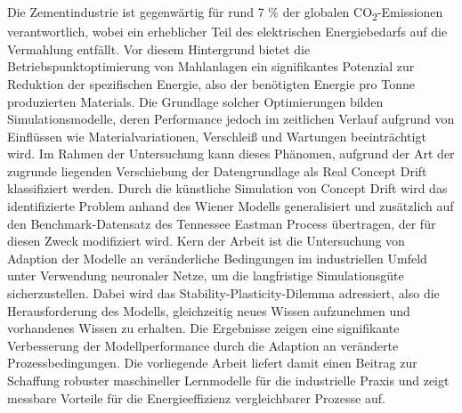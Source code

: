 
Die Zementindustrie ist gegenwärtig für rund 7 \% der globalen CO\textsubscript{2}-Emissionen verantwortlich, wobei ein erheblicher Teil des elektrischen Energiebedarfs auf die Vermahlung entfällt. Vor diesem Hintergrund bietet die Betriebspunktoptimierung von Mahlanlagen ein signifikantes Potenzial zur Reduktion der spezifischen Energie, also der benötigten Energie pro Tonne produzierten Materials. Die Grundlage solcher Optimierungen bilden Simulationsmodelle, deren Performance jedoch im zeitlichen Verlauf aufgrund von Einflüssen wie Materialvariationen, Verschleiß und Wartungen beeinträchtigt wird. Im Rahmen der Untersuchung kann dieses Phänomen, aufgrund der Art der zugrunde liegenden Verschiebung der Datengrundlage als Real Concept Drift klassifiziert werden. \newline
Durch die künstliche Simulation von Concept Drift wird das identifizierte Problem anhand des Wiener Modells generalisiert und zusätzlich auf den Benchmark-Datensatz des Tennessee Eastman Process übertragen, der für diesen Zweck modifiziert wird. \newline
Kern der Arbeit ist die Untersuchung von Adaption der Modelle an veränderliche Bedingungen im industriellen Umfeld unter Verwendung neuronaler Netze, um die langfristige Simulationsgüte sicherzustellen. Dabei wird das Stability-Plasticity-Dilemma adressiert, also die Herausforderung des Modells, gleichzeitig neues Wissen aufzunehmen und vorhandenes Wissen zu erhalten. \newline
Die Ergebnisse zeigen eine signifikante Verbesserung der Modellperformance durch die Adaption an veränderte Prozessbedingungen. Die vorliegende Arbeit liefert damit einen Beitrag zur Schaffung robuster maschineller Lernmodelle für die industrielle Praxis und zeigt messbare Vorteile für die Energieeffizienz vergleichbarer Prozesse auf.

\cleardoublepage